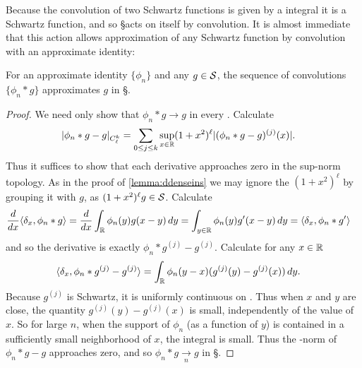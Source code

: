     Because the convolution of two Schwartz functions is given by a \gp integral it is a Schwartz function, and so \S acts on itself by convolution.
    It is almost immediate that this action allows approximation of any Schwartz function by convolution with an approximate identity:
    \begin{lemma}
      \label{lemma:approxbyconv}
      For an approximate identity $\{\phi_n\}$ and any $g\in\S$, the sequence of convolutions $\{\phi_n*g\}$ approximates $g$ in \S.
    \end{lemma}
    \begin{proof}
      We need only show that $\phi_n*g\rightarrow g$ in every \Ckl.
      Calculate
      \begin{align*}
        |\phi_n*g - g|_\Ckl
        &= \sum_{0\le j\le k} \sup_{x\in\R} (1+x^2)^\ell |(\phi_n*g - g)^{(j)}(x)| \text{.}
      \end{align*}
      Thus it suffices to show that each derivative approaches zero in the sup-norm topology.
      As in the proof of \cref{lemma:ddenseins} we may ignore the $(1+x^2)^\ell$ by grouping it with $g$, as $(1+x^2)^\ell g\in\S$.
      Calculate
      \begin{align*}
        \frac{d}{dx} \langle \delta_x, \phi_n*g\rangle
        &= \frac{d}{dx}\int_{\R} \phi_n(y)g(x-y)\,dy
        = \int_{y\in\R} \phi_n(y)g'(x-y)\,dy
        = \langle \delta_x, \phi_n*g'\rangle
      \end{align*}
      and so the derivative is exactly $\phi_n*g^{(j)}-g^{(j)}$.
      Calculate for any $x\in\R$
      \begin{align*}
        \langle \delta_x, \phi_n*g^{(j)}-g^{(j)}\rangle
        &= \int_\R  \phi_n(y-x)(g^{(j)}(y)-g^{(j)}(x))\,dy \text{.}
      \end{align*}
      Because $g^{(j)}$ is Schwartz, it is uniformly continuous on \R.
      Thus when $x$ and $y$ are close, the quantity $g^{(j)}(y)-g^{(j)}(x)$ is small, independently of the value of $x$.
      So for large $n$, when the support of $\phi_n$ (as a function of $y$) is contained in a sufficiently small neighborhood of $x$, the integral is small.
      Thus the \Ckl-norm of $\phi_n*g-g$ approaches zero, and so $\phi_n*g\underset{n}{\rightarrow}g$ in \S.
    \end{proof}


